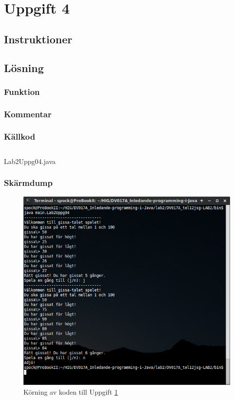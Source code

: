 \section{Uppgift 4}\label{sec:uppg04}

\subsection{Instruktioner}


\subsection{Lösning}
\subsubsection{Funktion}

\subsubsection{Kommentar}


\subsubsection{Källkod}
\inputminted[linenos]{java}{src/Lab2Uppg04.java}
\caption{Lab2Uppg04.java}
\label{src:uppg04}


\subsubsection{Skärmdump}
\begin{figure}[htbp]
    \centering
        \includegraphics[width=\linewidth]{img/04.png}
    \caption{Körning av koden till Uppgift \ref{sec:uppg04}}
    \label{fig:uppg04-screenshot}
\end{figure}

